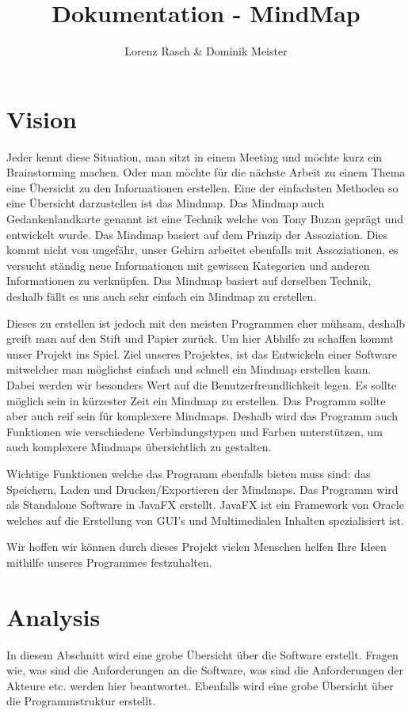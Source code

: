 \documentclass[a4paper,parskip]{scrartcl}
\title{Dokumentation - MindMap}
\author{Lorenz Rasch \& Dominik Meister}
\begin{document}
\maketitle
\tableofcontents
\pagebreak

\section{Vision}
Jeder kennt diese Situation, man sitzt in einem Meeting und möchte kurz ein Brainstorming machen. Oder man
möchte für die nächste Arbeit zu einem Thema eine Übersicht zu den Informationen erstellen. Eine der einfachsten Methoden so eine Übersicht darzustellen ist das Mindmap. Das Mindmap auch Gedankenlandkarte genannt ist eine Technik welche von Tony Buzan geprägt und entwickelt wurde. Das Mindmap basiert auf dem Prinzip der Assoziation. Dies kommt nicht von ungefähr, unser Gehirn arbeitet ebenfalls mit Assoziationen, es versucht ständig neue Informationen mit gewissen Kategorien und anderen Informationen zu verknüpfen. Das Mindmap basiert auf derselben Technik, deshalb fällt es uns auch sehr einfach ein Mindmap zu erstellen.

Dieses zu erstellen ist jedoch mit den meisten Programmen eher mühsam, deshalb greift man auf den Stift und Papier zurück. Um hier Abhilfe zu schaffen kommt unser Projekt ins Spiel. Ziel unseres Projektes, ist das Entwickeln einer Software mitwelcher man möglichst einfach und schnell ein Mindmap erstellen kann. \\
Dabei werden wir besonders Wert auf die Benutzerfreundlichkeit legen. Es sollte möglich sein in kürzester Zeit ein Mindmap zu erstellen. Das Programm sollte aber auch reif sein für komplexere Mindmaps. Deshalb wird das Programm auch Funktionen wie verschiedene Verbindungstypen und Farben unterstützen, um auch komplexere Mindmaps übersichtlich zu gestalten.

Wichtige Funktionen welche das Programm ebenfalls bieten muss sind: das Speichern, Laden und Drucken/Exportieren der Mindmaps. 
Das Programm wird als Standalone Software in JavaFX erstellt. JavaFX ist ein Framework von Oracle welches auf die Erstellung von GUI's und Multimedialen Inhalten spezialisiert ist.

Wir hoffen wir können durch dieses Projekt vielen Menschen helfen Ihre Ideen mithilfe unseres Programmes
festzuhalten.

\section{Analysis}
In diesem Abschnitt wird eine grobe Übersicht über die Software erstellt. Fragen wie, was sind die Anforderungen an die Software, was sind die Anforderungen der Akteure etc. werden hier beantwortet. Ebenfalls wird eine grobe Übersicht über die Programmstruktur erstellt.
\end{document}
